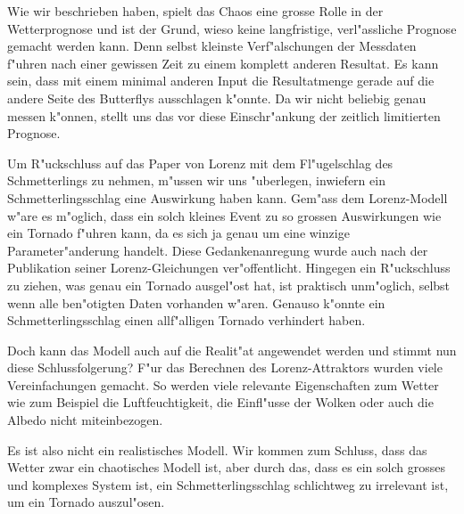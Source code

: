 
Wie wir beschrieben haben, spielt das Chaos eine grosse Rolle in der Wetterprognose und ist der Grund, wieso keine langfristige, verl"assliche Prognose gemacht werden kann. Denn selbst kleinste Verf"alschungen der Messdaten f"uhren nach einer gewissen Zeit zu einem komplett anderen Resultat. Es kann sein, dass mit einem minimal anderen Input die Resultatmenge gerade auf die andere Seite des Butterflys ausschlagen k"onnte. Da wir nicht beliebig genau messen k"onnen, stellt uns das vor diese Einschr"ankung der zeitlich limitierten Prognose.

Um R"uckschluss auf das Paper von Lorenz mit dem Fl"ugelschlag des Schmetterlings zu nehmen, m"ussen wir uns "uberlegen, inwiefern ein Schmetterlingsschlag eine Auswirkung haben kann. Gem"ass dem Lorenz-Modell w"are es m"oglich, dass ein solch kleines Event zu so grossen Auswirkungen wie ein Tornado f"uhren kann, da es sich ja genau um eine winzige Parameter"anderung handelt. Diese Gedankenanregung wurde auch nach der Publikation seiner Lorenz-Gleichungen ver"offentlicht. Hingegen ein R"uckschluss zu ziehen, was genau ein Tornado ausgel"ost hat, ist praktisch unm"oglich, selbst wenn alle ben"otigten Daten vorhanden w"aren. Genauso k"onnte ein Schmetterlingsschlag einen allf"alligen Tornado verhindert haben.

Doch kann das Modell auch auf die Realit"at angewendet werden und stimmt nun diese Schlussfolgerung? F"ur das Berechnen des Lorenz-Attraktors wurden viele Vereinfachungen gemacht. So werden viele relevante Eigenschaften zum Wetter wie zum Beispiel die Luftfeuchtigkeit, die Einfl"usse der Wolken oder auch die Albedo nicht miteinbezogen. 

Es ist also nicht ein realistisches Modell. Wir kommen zum Schluss, dass das Wetter zwar ein chaotisches Modell ist, aber durch das, dass es ein solch grosses und komplexes System ist, ein Schmetterlingsschlag schlichtweg zu irrelevant ist, um ein Tornado auszul"osen. 
